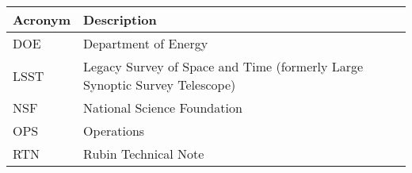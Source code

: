 \addtocounter{table}{-1}
\begin{longtable}{p{}p{}}\hline
\textbf{Acronym} & \textbf{Description}  \\\hline

DOE & Department of Energy \\\hline
LSST & Legacy Survey of Space and Time (formerly Large Synoptic Survey Telescope) \\\hline
NSF & National Science Foundation \\\hline
OPS & Operations \\\hline
RTN & Rubin Technical Note \\\hline
\end{longtable}

